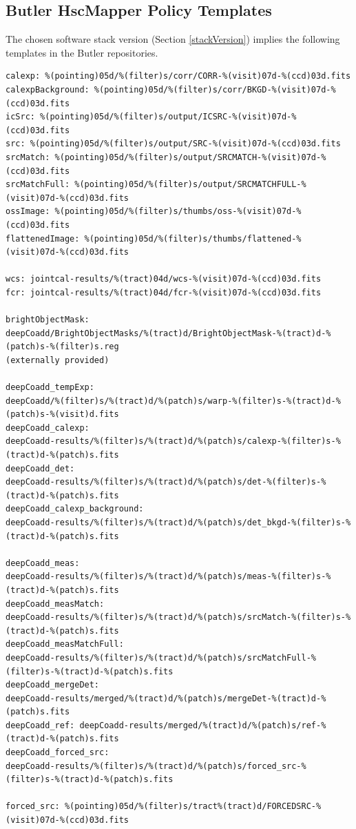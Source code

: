 \documentclass[DM,authoryear,toc]{lsstdoc}
\begin{document}
\subsection{Butler HscMapper Policy Templates}
The chosen software stack version (Section \ref{stackVersion}) implies the following templates in the Butler repositories.

\begin{verbatim}
calexp: %(pointing)05d/%(filter)s/corr/CORR-%(visit)07d-%(ccd)03d.fits
calexpBackground: %(pointing)05d/%(filter)s/corr/BKGD-%(visit)07d-%(ccd)03d.fits
icSrc: %(pointing)05d/%(filter)s/output/ICSRC-%(visit)07d-%(ccd)03d.fits
src: %(pointing)05d/%(filter)s/output/SRC-%(visit)07d-%(ccd)03d.fits
srcMatch: %(pointing)05d/%(filter)s/output/SRCMATCH-%(visit)07d-%(ccd)03d.fits
srcMatchFull: %(pointing)05d/%(filter)s/output/SRCMATCHFULL-%(visit)07d-%(ccd)03d.fits
ossImage: %(pointing)05d/%(filter)s/thumbs/oss-%(visit)07d-%(ccd)03d.fits
flattenedImage: %(pointing)05d/%(filter)s/thumbs/flattened-%(visit)07d-%(ccd)03d.fits

wcs: jointcal-results/%(tract)04d/wcs-%(visit)07d-%(ccd)03d.fits
fcr: jointcal-results/%(tract)04d/fcr-%(visit)07d-%(ccd)03d.fits

brightObjectMask:
deepCoadd/BrightObjectMasks/%(tract)d/BrightObjectMask-%(tract)d-%(patch)s-%(filter)s.reg
(externally provided)

deepCoadd_tempExp:
deepCoadd/%(filter)s/%(tract)d/%(patch)s/warp-%(filter)s-%(tract)d-%(patch)s-%(visit)d.fits
deepCoadd_calexp:
deepCoadd-results/%(filter)s/%(tract)d/%(patch)s/calexp-%(filter)s-%(tract)d-%(patch)s.fits
deepCoadd_det:
deepCoadd-results/%(filter)s/%(tract)d/%(patch)s/det-%(filter)s-%(tract)d-%(patch)s.fits
deepCoadd_calexp_background:
deepCoadd-results/%(filter)s/%(tract)d/%(patch)s/det_bkgd-%(filter)s-%(tract)d-%(patch)s.fits

deepCoadd_meas:
deepCoadd-results/%(filter)s/%(tract)d/%(patch)s/meas-%(filter)s-%(tract)d-%(patch)s.fits
deepCoadd_measMatch:
deepCoadd-results/%(filter)s/%(tract)d/%(patch)s/srcMatch-%(filter)s-%(tract)d-%(patch)s.fits
deepCoadd_measMatchFull:
deepCoadd-results/%(filter)s/%(tract)d/%(patch)s/srcMatchFull-%(filter)s-%(tract)d-%(patch)s.fits
deepCoadd_mergeDet:
deepCoadd-results/merged/%(tract)d/%(patch)s/mergeDet-%(tract)d-%(patch)s.fits
deepCoadd_ref: deepCoadd-results/merged/%(tract)d/%(patch)s/ref-%(tract)d-%(patch)s.fits
deepCoadd_forced_src:
deepCoadd-results/%(filter)s/%(tract)d/%(patch)s/forced_src-%(filter)s-%(tract)d-%(patch)s.fits

forced_src: %(pointing)05d/%(filter)s/tract%(tract)d/FORCEDSRC-%(visit)07d-%(ccd)03d.fits
\end{verbatim}
\end{document}
